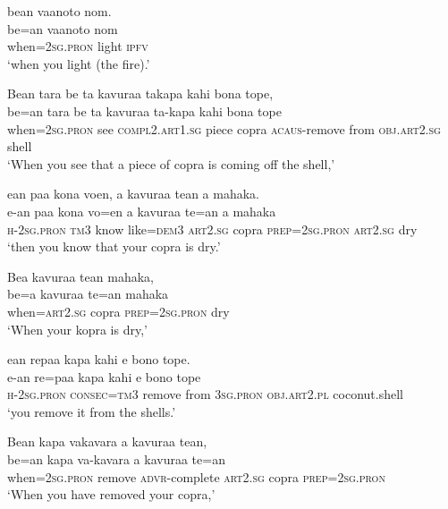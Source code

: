 \ea\label{ex:text01-166}
bean vaanoto nom.\\
\gll be=an	vaanoto	nom\\
     when=2\textsc{sg}.\textsc{pron}	light	\textsc{ipfv}\\
\glt `when you light (the fire).'
\z

\ea\label{ex:text01-167}
Bean tara be ta kavuraa takapa kahi bona tope,\\
\gll be=an	tara	be	ta	kavuraa	ta-kapa	kahi	bona	tope\\
     when=2\textsc{sg}.\textsc{pron}	see	\textsc{compl}2.\textsc{art}1.\textsc{sg}	piece	copra	\textsc{acaus}-remove	from	\textsc{obj}.\textsc{art}2.\textsc{sg}	shell\\
\glt `When you see that a piece of copra is coming off the shell,'
\z

\ea\label{ex:text01-168}
ean paa kona voen, a kavuraa tean a mahaka.\\
\gll e-an	paa	kona	vo=en	a	kavuraa	te=an	a	mahaka\\
     \textsc{h}-2\textsc{sg}.\textsc{pron}	\textsc{tm}3	know	like=\textsc{dem}3	\textsc{art}2.\textsc{sg}	copra	\textsc{prep}=2\textsc{sg}.\textsc{pron}	\textsc{art}2.\textsc{sg}	dry\\
\glt `then you know that your copra is dry.'
\z

\ea\label{ex:text01-169}
Bea kavuraa tean mahaka,\\
\gll be=a	kavuraa	te=an	mahaka\\
     when=\textsc{art}2.\textsc{sg}	copra	\textsc{prep}=2\textsc{sg}.\textsc{pron}	dry\\
\glt `When your kopra is dry,'
\z

\ea\label{ex:text01-170}
ean repaa kapa kahi e bono tope.\\
\gll e-an	re=paa	kapa	kahi	e	bono	tope\\
     \textsc{h}-2\textsc{sg}.\textsc{pron}	\textsc{consec}=\textsc{tm}3	remove	from	3\textsc{sg}.\textsc{pron}	\textsc{obj}.\textsc{art}2.\textsc{pl}	coconut.shell\\
\glt `you remove it from the shells.'
\z

\newpage
\ea\label{ex:text01-171}
Bean kapa vakavara a kavuraa tean,\\
\gll be=an	kapa	va-kavara	a	kavuraa	te=an\\
     when=2\textsc{sg}.\textsc{pron}	remove	\textsc{advr}-complete	\textsc{art}2.\textsc{sg}	copra	\textsc{prep}=2\textsc{sg}.\textsc{pron}\\
\glt `When you have removed your copra,'
\z

